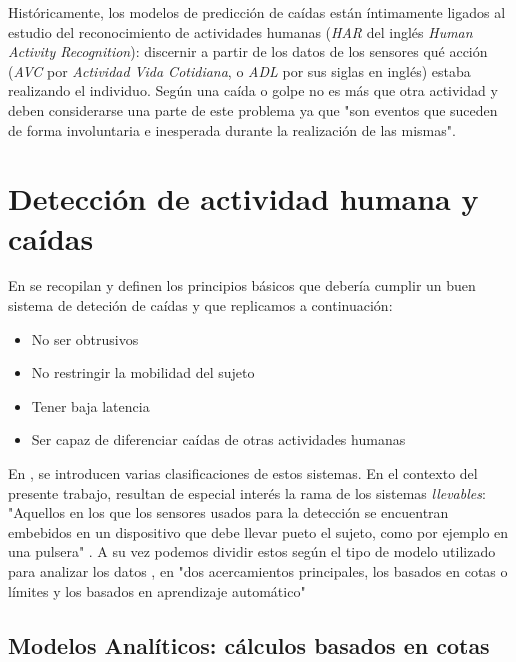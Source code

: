 \documentclass[../tfm.tex]{subfiles}
\begin{document}
Históricamente, los modelos de predicción de caídas están íntimamente ligados al estudio del reconocimiento de actividades humanas (\textit{HAR} del inglés \textit{Human Activity Recognition}): discernir a partir de los datos de los sensores qué acción (\textit{AVC} por \textit{Actividad Vida Cotidiana}, o \textit{ADL} por sus siglas en inglés) estaba realizando el individuo. Según \cite[p.10692]{Ozdemir2014} una caída o golpe no es más que otra actividad y deben considerarse una parte de este problema ya que "son eventos que suceden de forma involuntaria e inesperada durante la realización de las mismas".


\section{Detección de actividad humana y caídas}\label{sect:sa_har}

En \cite[p.2]{Anita2020} se recopilan y definen los principios básicos que debería cumplir un buen sistema de deteción de caídas y que replicamos a continuación:

\begin{itemize}
  \item No ser obtrusivos
  \item No restringir la mobilidad del sujeto
  \item Tener baja latencia
  \item Ser capaz de diferenciar caídas de otras actividades humanas
\end{itemize}

En \cite{Musci2020,Anita2020}, se introducen varias clasificaciones de estos sistemas. En el contexto del presente trabajo, resultan de especial interés la rama de los sistemas \textit{llevables}: "Aquellos en los que los sensores usados para la detección se encuentran embebidos en un dispositivo que debe llevar pueto el sujeto, como por ejemplo en una pulsera" \cite[p.3]{Anita2020}. A su vez podemos dividir estos según el tipo de modelo utilizado para analizar los datos \cite{Anita2020,Lim2014}, en "dos acercamientos principales, los basados en cotas o límites y los basados en aprendizaje automático"\cite[p.1]{Lim2014}

\subsection{Modelos Analíticos: cálculos basados en cotas}\label{sa_modelos_analiticos}
\end{document}
